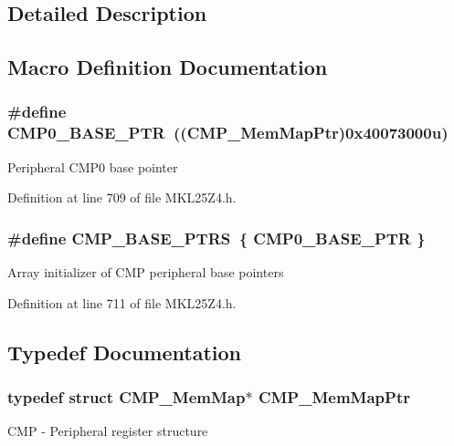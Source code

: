 \subsection{Detailed Description}


\subsection{Macro Definition Documentation}
\subsubsection[{\texorpdfstring{C\+M\+P0\+\_\+\+B\+A\+S\+E\+\_\+\+P\+TR}{CMP0_BASE_PTR}}]{\setlength{\rightskip}{0pt plus 5cm}\#define C\+M\+P0\+\_\+\+B\+A\+S\+E\+\_\+\+P\+TR~(({\bf C\+M\+P\+\_\+\+Mem\+Map\+Ptr})0x40073000u)}\hypertarget{group___c_m_p___peripheral_ga5a7a6b1d0743a05435ba5cb2dc2b3431}{}\label{group___c_m_p___peripheral_ga5a7a6b1d0743a05435ba5cb2dc2b3431}
Peripheral C\+M\+P0 base pointer 

Definition at line 709 of file M\+K\+L25\+Z4.\+h.

\subsubsection[{\texorpdfstring{C\+M\+P\+\_\+\+B\+A\+S\+E\+\_\+\+P\+T\+RS}{CMP_BASE_PTRS}}]{\setlength{\rightskip}{0pt plus 5cm}\#define C\+M\+P\+\_\+\+B\+A\+S\+E\+\_\+\+P\+T\+RS~\{ {\bf C\+M\+P0\+\_\+\+B\+A\+S\+E\+\_\+\+P\+TR} \}}\hypertarget{group___c_m_p___peripheral_gacc69654296499d45b2060956a3c8e97f}{}\label{group___c_m_p___peripheral_gacc69654296499d45b2060956a3c8e97f}
Array initializer of C\+MP peripheral base pointers 

Definition at line 711 of file M\+K\+L25\+Z4.\+h.



\subsection{Typedef Documentation}
\subsubsection[{\texorpdfstring{C\+M\+P\+\_\+\+Mem\+Map\+Ptr}{CMP_MemMapPtr}}]{\setlength{\rightskip}{0pt plus 5cm}typedef struct {\bf C\+M\+P\+\_\+\+Mem\+Map}$\ast$ {\bf C\+M\+P\+\_\+\+Mem\+Map\+Ptr}}\hypertarget{group___c_m_p___peripheral_ga6f5d370df3839e41b771c2d0b89cbb83}{}\label{group___c_m_p___peripheral_ga6f5d370df3839e41b771c2d0b89cbb83}
C\+MP -\/ Peripheral register structure 